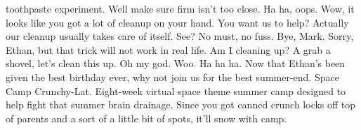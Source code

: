 \documentclass{article}
\begin{document}
toothpaste experiment. Well make sure firm isn't too close. Ha ha, oops. Wow, it looks like you got a lot of cleanup on your hand. You want us to help? Actually our cleanup usually takes care of itself. See? No must, no fuss. Bye, Mark. Sorry, Ethan, but that trick will not work in real life. Am I cleaning up? A grab a shovel, let's clean this up. Oh my god. Woo. Ha ha ha. Now that Ethan's been given the best birthday ever, why not join us for the best summer-end. Space Camp Crunchy-Lat. Eight-week virtual space theme summer camp designed to help fight that summer brain drainage. Since you got canned crunch locks off top of parents and a sort of a little bit of spots, it'll snow with camp.
\end{document}
